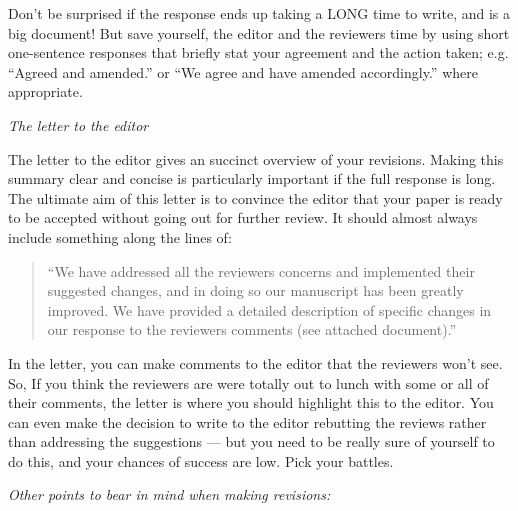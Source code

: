 \documentclass[11pt,]{article}
\begin{document}
Don't be surprised if the response ends up taking a LONG time to write,
and is a big document! But save yourself, the editor and the reviewers
time by using short one-sentence responses that briefly stat your
agreement and the action taken; e.g. ``Agreed and amended.'' or ``We
agree and have amended accordingly.'' where appropriate.

\bigskip{}

\emph{The letter to the editor}

The letter to the editor gives an succinct overview of your revisions.
Making this summary clear and concise is particularly important if the
full response is long. The ultimate aim of this letter is to convince
the editor that your paper is ready to be accepted without going out for
further review. It should almost always include something along the
lines of:

\begin{quote}
``We have addressed all the reviewers concerns and implemented their
suggested changes, and in doing so our manuscript has been greatly
improved. We have provided a detailed description of specific changes in
our response to the reviewers comments (see attached document).''
\end{quote}

In the letter, you can make comments to the editor that the reviewers
won't see. So, If you think the reviewers are were totally out to lunch
with some or all of their comments, the letter is where you should
highlight this to the editor. You can even make the decision to write to
the editor rebutting the reviews rather than addressing the suggestions
--- but you need to be really sure of yourself to do this, and your
chances of success are low. Pick your battles. \bigskip{}

\emph{Other points to bear in mind when making revisions:}
\end{document}
